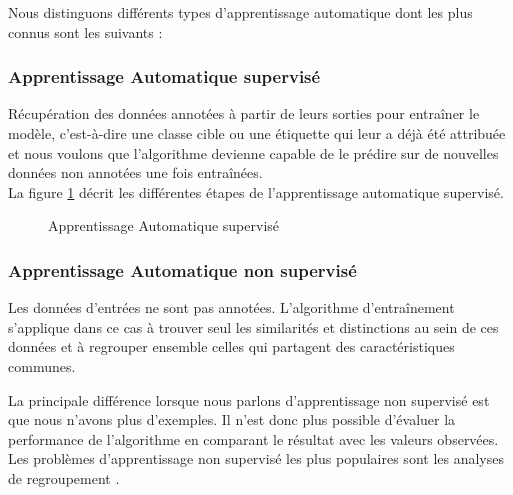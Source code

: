 Nous distinguons différents types d'apprentissage automatique dont les plus connus sont les suivants :
   \subsubsection{Apprentissage Automatique supervisé}
  Récupération des données annotées à partir de leurs sorties pour entraîner le modèle, c'est-à-dire une classe cible ou une étiquette qui leur a déjà été attribuée et nous voulons que l'algorithme devienne capable de le prédire sur de nouvelles données non annotées une fois entraînées.\\
  La figure \ref{fig:usecaseMLSupervised} décrit les différentes étapes de l'apprentissage automatique supervisé.
  \vspace{0.25cm}
      \begin{figure}[htpb]
    \centering
    \caption{Apprentissage Automatique supervisé}
    \label{fig:usecaseMLSupervised}
    \end{figure}

    \subsubsection{Apprentissage Automatique non supervisé}
    Les données d'entrées ne sont pas annotées. L'algorithme d'entraînement s'applique dans ce cas à trouver seul les similarités et distinctions au sein de ces données et à regrouper ensemble celles qui partagent des caractéristiques communes.

    La principale différence lorsque nous parlons d'apprentissage non supervisé est que nous n'avons plus d'exemples. Il n'est donc plus possible d'évaluer la performance de l'algorithme en comparant le résultat avec les valeurs observées. Les problèmes d'apprentissage non supervisé les plus populaires sont les analyses de regroupement \cite{unSupervised}.
